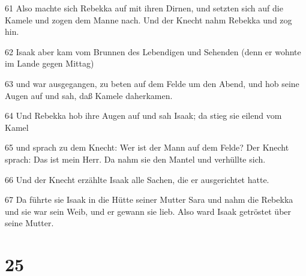 \par 61 Also machte sich Rebekka auf mit ihren Dirnen, und setzten sich auf die Kamele und zogen dem Manne nach. Und der Knecht nahm Rebekka und zog hin.
\par 62 Isaak aber kam vom Brunnen des Lebendigen und Sehenden (denn er wohnte im Lande gegen Mittag)
\par 63 und war ausgegangen, zu beten auf dem Felde um den Abend, und hob seine Augen auf und sah, daß Kamele daherkamen.
\par 64 Und Rebekka hob ihre Augen auf und sah Isaak; da stieg sie eilend vom Kamel
\par 65 und sprach zu dem Knecht: Wer ist der Mann auf dem Felde? Der Knecht sprach: Das ist mein Herr. Da nahm sie den Mantel und verhüllte sich.
\par 66 Und der Knecht erzählte Isaak alle Sachen, die er ausgerichtet hatte.
\par 67 Da führte sie Isaak in die Hütte seiner Mutter Sara und nahm die Rebekka und sie war sein Weib, und er gewann sie lieb. Also ward Isaak getröstet über seine Mutter.

\chapter{25}


